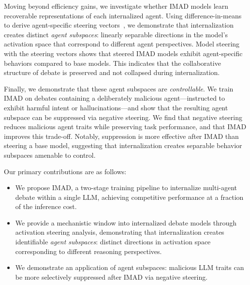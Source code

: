 \documentclass[11pt]{article}
\begin{document}
Moving beyond efficiency gains, we investigate whether IMAD models learn recoverable representations of each internalized agent. Using difference-in-means~\cite{marks2023geometry} to derive agent-specific steering vectors~\cite{subramani2022extracting,turner2023steering, rimsky2024steering, wu2025axbench}, 
we demonstrate that internalization creates distinct \textit{agent subspaces}: linearly separable directions in the model's activation space that correspond to different agent perspectives. 
Model steering with the steering vectors shows that steered IMAD models exhibit agent-specific behaviors compared to base models. This indicates that the collaborative structure of debate is preserved and not collapsed during internalization.

Finally, we demonstrate that these agent subspaces are \textit{controllable}. 
We train IMAD on debates containing a deliberately malicious agent---instructed to exhibit harmful intent or hallucinations---and show that the resulting agent subspace can be suppressed via negative steering.
We find that negative steering reduces malicious agent traits while preserving task performance, and that IMAD improves this trade-off. Notably, suppression is more effective after IMAD than steering a base model, suggesting that internalization creates separable behavior subspaces amenable to control.


Our primary contributions are as follows:
\begin{itemize}[noitemsep]
    \item We propose IMAD, a two-stage training pipeline to internalize multi-agent debate within a single LLM, achieving competitive performance at a fraction of the inference cost.
    \item We provide a mechanistic window into internalized debate models through activation steering analysis, demonstrating that internalization creates identifiable \textit{agent subspaces}: distinct directions in activation space corresponding to different reasoning perspectives.
    \item We demonstrate an application of agent subspaces: malicious LLM traits can be more selectively suppressed after IMAD via negative steering.
\end{itemize}
\end{document}
